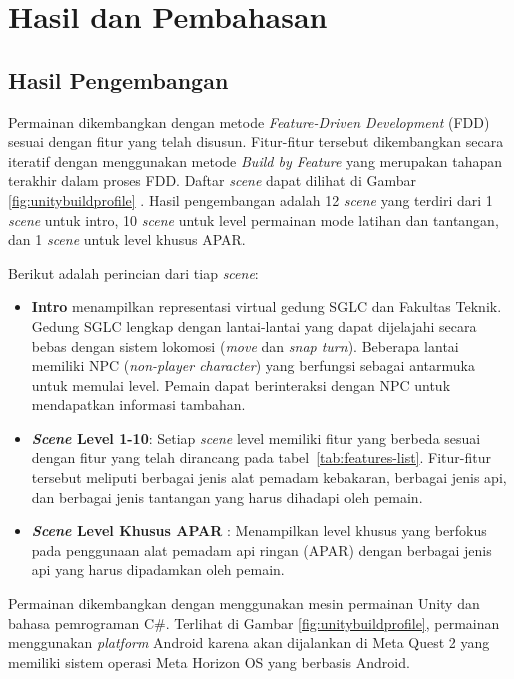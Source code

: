 \chapter{Hasil dan Pembahasan}

\section{Hasil Pengembangan}
Permainan dikembangkan dengan metode \textit{Feature-Driven Development} (FDD) sesuai dengan fitur yang telah disusun. Fitur-fitur tersebut dikembangkan secara iteratif dengan menggunakan metode \textit{Build by Feature} yang merupakan tahapan terakhir dalam proses FDD. Daftar \textit{scene} dapat dilihat di Gambar \ref{fig:unitybuildprofile} . Hasil pengembangan adalah 12 \textit{scene} yang terdiri dari 1 \textit{scene} untuk intro, 10 \textit{scene} untuk level permainan mode latihan dan tantangan, dan 1 \textit{scene} untuk level khusus APAR. 

Berikut adalah perincian dari tiap \textit{scene}:

\begin{itemize}
	\item \textbf{Intro} menampilkan representasi virtual gedung SGLC dan Fakultas Teknik. Gedung SGLC lengkap dengan lantai-lantai yang dapat dijelajahi secara bebas dengan sistem lokomosi (\textit{move} dan \textit{snap turn}). Beberapa lantai memiliki NPC (\textit{non-player character}) yang berfungsi sebagai antarmuka untuk memulai level. Pemain dapat berinteraksi dengan NPC untuk mendapatkan informasi tambahan.
	\item \textbf{\textit{Scene} Level 1-10}: Setiap \textit{scene} level memiliki fitur yang berbeda sesuai dengan fitur yang telah dirancang pada tabel~\ref{tab:features-list}. Fitur-fitur tersebut meliputi berbagai jenis alat pemadam kebakaran, berbagai jenis api, dan berbagai jenis tantangan yang harus dihadapi oleh pemain.
	\item \textbf{\textit{Scene} Level Khusus APAR} : Menampilkan level khusus yang berfokus pada penggunaan alat pemadam api ringan (APAR) dengan berbagai jenis api yang harus dipadamkan oleh pemain.
\end{itemize}

Permainan dikembangkan dengan menggunakan mesin permainan Unity dan bahasa pemrograman C\#. Terlihat di Gambar \ref{fig:unitybuildprofile}, permainan menggunakan \textit{platform} Android karena akan dijalankan di Meta Quest 2 yang memiliki sistem operasi Meta Horizon OS yang berbasis Android.

